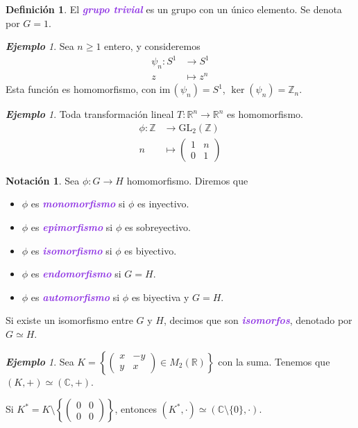 \documentclass{article}
\theoremstyle{definition}
\newtheorem{definition}[theorem]{Definición}
\newtheorem*{notation}{Notación}
\theoremstyle{remark}
\newtheorem{example}[theorem]{\textbf{Ejemplo}}
\numberwithin{equation}{section}
\newcommand{\C}{\mathbb{C}}
\newcommand{\R}{\mathbb{R}}
\newcommand{\Z}{\mathbb{Z}}
\renewcommand{\c}{\cdot}
\newcommand{\im}{\mathrm{im}\,}
\newcommand{\GL}{\mathrm{GL}}
\newcommand{\set}[1]{\left\{ #1 \right\}}
\newcommand{\matr}[1]{\begin{pmatrix}#1\end{pmatrix}}
\renewcommand{\o}{\to}
\newcommand{\wea}[1]{\textcolor{BlueViolet}{\textbf{\emph{#1}}}}
\begin{document}
\begin{definition}
  El \wea{grupo trivial} es un grupo con un único elemento. Se denota por $G = 1$.
\end{definition}

\begin{example}
  Sea $n \geq 1$ entero, y consideremos
  \begin{align*}
    \psi_n \colon S^1 &\to S^1 \\
    z &\mapsto z^n
  \end{align*}
  Esta función es homomorfismo, con $\im(\psi_n) = S^1$, $\ker(\psi_n) = \Z_n$.
\end{example}

\begin{example}
  Toda transformación lineal $T \colon \R^n \to \R^n$ es homomorfismo.
  \begin{align*}
    \phi \colon \Z &\to \GL_2(\Z) \\
    n &\mapsto \matr{1&n\\0&1}
  \end{align*}
\end{example}

\begin{notation}
  Sea $\phi \colon G \o H$ homomorfismo. Diremos que
  \begin{itemize}
    \item $\phi$ es \wea{monomorfismo} si $\phi$ es inyectivo.
    \item $\phi$ es \wea{epimorfismo} si $\phi$ es sobreyectivo.
    \item $\phi$ es \wea{isomorfismo} si $\phi$ es biyectivo.
    \item $\phi$ es \wea{endomorfismo} si $G=H$.
    \item $\phi$ es \wea{automorfismo} si $\phi$ es biyectiva y $G=H$.
  \end{itemize}
  Si existe un isomorfismo entre $G$ y $H$, decimos que son \wea{isomorfos}, denotado por $G \simeq H$.
\end{notation}

\begin{example}
  Sea $K = \set{\matr{x&-y\\y&x} \in M_2(\R)}$ con la suma. Tenemos que $(K,+) \simeq (\C,+)$.

  Si $K^\ast = K \setminus \set{\matr{0&0\\0&0}}$, entonces $(K^\ast,\c) \simeq (\C \setminus \{0\}, \c)$.
\end{example}
\end{document}
